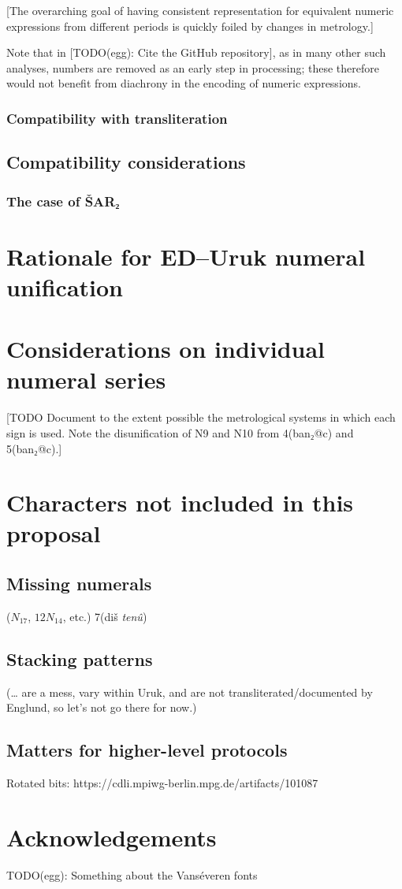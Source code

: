 \documentclass[10pt, a4paper, twoside]{article}
\begin{document}
[The overarching goal of having consistent representation for
equivalent numeric expressions from different periods
is quickly foiled by changes in metrology.]

Note that in \cite{Romach24} [TODO(egg): Cite the GitHub repository],
as in many other such analyses, numbers are removed as an early step
in processing; these therefore would not benefit from diachrony in
the encoding of numeric expressions.

\subsubsection{Compatibility with transliteration}

\subsection{Compatibility considerations}
\label{compatibility}

\subsubsection{The case of ŠAR₂}


\section{Rationale for ED–Uruk numeral unification}
\label{unificationRationale}

\section{Considerations on individual numeral series}

[TODO Document to the extent possible the metrological systems in which each sign is used.
Note the disunification of N9 and N10 from 4(ban₂@c) and 5(ban₂@c).]

\section{Characters not included in this proposal}
\subsection{Missing numerals}
($N_{17}$, $12N_{14}$, etc.) 7(diš \emph{tenû})
\subsection{Stacking patterns}
(… are a mess, vary within Uruk, and are not transliterated/documented by Englund, so let’s not go there for now.)
\subsection{Matters for higher-level protocols}
Rotated bits:
https://cdli.mpiwg-berlin.mpg.de/artifacts/101087

\section{Acknowledgements}

TODO(egg): Something about the Vanséveren fonts

\printbibliography
\end{document}
